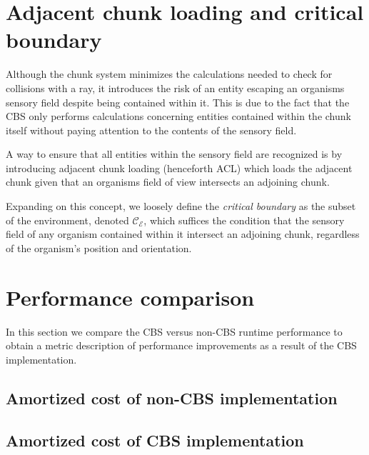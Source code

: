 \documentclass[a4paper, 12pt]{report}
\theoremstyle{definition}
\begin{document}
\section{Adjacent chunk loading and critical boundary}
Although the chunk system minimizes the calculations needed to check for collisions with a ray, it introduces the risk of an entity
escaping an organisms sensory field despite being contained within it. This is due to the fact that the CBS only performs calculations
concerning entities contained within the chunk itself without paying attention to the contents of the sensory field.
\par A way to ensure that all entities within the sensory field are recognized is by introducing adjacent chunk loading (henceforth ACL)
which loads the adjacent chunk given that an organisms field of view intersects an adjoining chunk.
\par Expanding on this concept, we loosely define the \emph{critical boundary} as the subset of the environment, denoted $\mathcal C_{\mathscr E}$,
which suffices the condition that the sensory field of any organism contained within it intersect an adjoining chunk, regardless of the organism's position
and orientation.

\section{Performance comparison}
In this section we compare the CBS versus non-CBS runtime performance to obtain a metric description
of performance improvements as a result of the CBS implementation.

\subsection{Amortized cost of non-CBS implementation}

\subsection{Amortized cost of CBS implementation}
\end{document}
